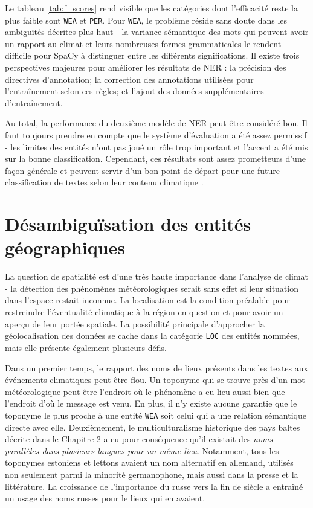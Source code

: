 \documentclass[a4paper,twoside,12pt]{article}
\begin{document}
Le tableau \ref{tab:f_scores} rend visible que les catégories dont l'efficacité reste la plus faible sont \texttt{WEA} et \texttt{PER}. Pour \texttt{WEA}, le problème réside sans doute dans les ambiguïtés décrites plus haut - la variance sémantique des mots qui peuvent avoir un rapport au climat et leurs nombreuses formes grammaticales le rendent difficile pour SpaCy à distinguer entre les différents significations. Il existe trois perspectives majeures pour améliorer les résultats de NER : la précision des directives d'annotation; la correction des annotations utilisées pour l'entraînement selon ces règles; et l'ajout des données supplémentaires d'entraînement.

Au total, la performance du deuxième modèle de NER peut être considéré bon. Il faut toujours prendre en compte que le système d'évaluation a été assez permissif - les limites des entités n'ont pas joué un rôle trop important et l'accent a été mis sur la bonne classification. Cependant, ces résultats sont assez prometteurs d'une façon générale et peuvent servir d'un bon point de départ pour une future classification de textes selon leur contenu \og climatique \fg{}.


\clearpage



\section{Désambiguïsation des entités géographiques}

La question de spatialité est d'une très haute importance dans l'analyse de climat - la détection des phénomènes météorologiques serait sans effet si leur situation dans l'espace restait inconnue. La localisation est la condition préalable pour restreindre l'éventualité climatique à la région en question et pour avoir un aperçu de leur portée spatiale. La possibilité principale d'approcher la géolocalisation des données se cache dans la catégorie \texttt{LOC} des entités nommées, mais elle présente également plusieurs défis.

Dans un premier temps, le rapport des noms de lieux présents dans les textes aux événements climatiques peut être flou. Un toponyme qui se trouve près d'un mot météorologique peut être l'endroit où le phénomène a eu lieu aussi bien que l'endroit d'où le message est venu. En plus, il n'y existe aucune garantie que le toponyme le plus proche à une entité \texttt{WEA} soit celui qui a une relation sémantique directe avec elle. Deuxièmement, le multiculturalisme historique des pays baltes décrite dans le Chapitre 2 a eu pour conséquence qu'il existait des \textit{noms parallèles dans plusieurs langues pour un même lieu}. Notamment, tous les toponymes estoniens et lettons avaient un nom alternatif en allemand, utilisés non seulement parmi la minorité germanophone, mais aussi dans la presse et la littérature. La croissance de l'importance du russe vers la fin de siècle a entraîné un usage des noms russes pour le lieux qui en avaient.
\end{document}
